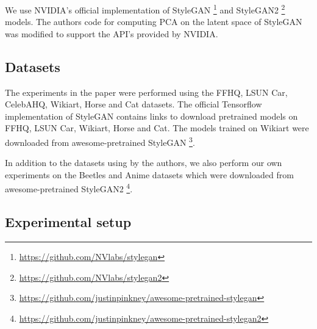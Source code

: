 \documentclass{article}
\begin{document}
We use NVIDIA's official implementation of StyleGAN \footnote{\url{https://github.com/NVlabs/stylegan}} and StyleGAN2 \footnote{\url{https://github.com/NVlabs/stylegan2}} models. The authors code for computing PCA on the latent space of StyleGAN was modified to support the API's provided by NVIDIA.

\subsection{Datasets}

The experiments in the paper were performed using the FFHQ, LSUN Car, CelebAHQ, Wikiart, Horse and Cat datasets. The official Tensorflow implementation of StyleGAN contains links to download pretrained models on FFHQ, LSUN Car, Wikiart, Horse and Cat. The models trained on Wikiart were downloaded from awesome-pretrained StyleGAN \footnote{\url{https://github.com/justinpinkney/awesome-pretrained-stylegan}}.

In addition to the datasets using by the authors, we also perform our own experiments on the Beetles and Anime datasets which were downloaded from awesome-pretrained StyleGAN2 \footnote{\url{https://github.com/justinpinkney/awesome-pretrained-stylegan2}}.


\subsection{Experimental setup}
\end{document}
